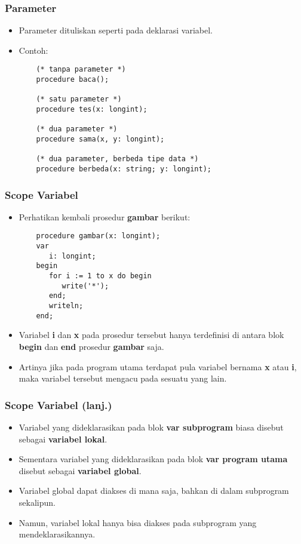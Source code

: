 \documentclass{beamer}
\begin{document}
\begin{frame}[fragile]
\frametitle{Parameter}
\begin{itemize}
	\item Parameter dituliskan seperti pada deklarasi variabel.
	\item Contoh:
	\begin{lstlisting}
	(* tanpa parameter *)
	procedure baca();
	
	(* satu parameter *)
	procedure tes(x: longint);
	
	(* dua parameter *)
	procedure sama(x, y: longint); 
	
	(* dua parameter, berbeda tipe data *)
	procedure berbeda(x: string; y: longint); 
	\end{lstlisting}
\end{itemize}
\end{frame}

\begin{frame}[fragile]
\frametitle{Scope Variabel}
\begin{itemize}
	\item Perhatikan kembali prosedur \textbf{gambar} berikut:
	\begin{lstlisting}
	procedure gambar(x: longint);
	var
	   i: longint;
	begin
	   for i := 1 to x do begin
	      write('*');
	   end;
	   writeln;
	end;
	\end{lstlisting}
	\item Variabel \textbf{i} dan \textbf{x} pada prosedur tersebut hanya terdefinisi di antara blok \textbf{begin} dan \textbf{end} prosedur \textbf{gambar} saja.
	\item Artinya jika pada program utama terdapat pula variabel bernama \textbf{x} atau \textbf{i}, maka variabel tersebut mengacu pada \alert{sesuatu yang lain}.
\end{itemize}
\end{frame}

\begin{frame}[fragile]
\frametitle{Scope Variabel (lanj.)}
\begin{itemize}
	\item Variabel yang dideklarasikan pada blok \textbf{var subprogram} biasa disebut sebagai \textbf{variabel lokal}.
	\item Sementara variabel yang dideklarasikan pada blok \textbf{var program utama} disebut sebagai \textbf{variabel global}.
	\item Variabel global dapat diakses di mana saja, bahkan di dalam subprogram sekalipun.
	\item Namun, variabel lokal hanya bisa diakses pada subprogram yang mendeklarasikannya.
\end{itemize}
\end{frame}
\end{document}
